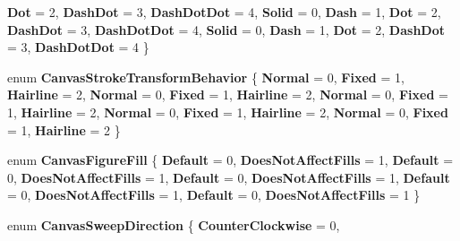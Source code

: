 \begin{DoxyCompactItemize}
\newline
{\bfseries Dot} = 2, 
{\bfseries Dash\+Dot} = 3, 
{\bfseries Dash\+Dot\+Dot} = 4, 
{\bfseries Solid} = 0, 
\newline
{\bfseries Dash} = 1, 
{\bfseries Dot} = 2, 
{\bfseries Dash\+Dot} = 3, 
{\bfseries Dash\+Dot\+Dot} = 4, 
\newline
{\bfseries Solid} = 0, 
{\bfseries Dash} = 1, 
{\bfseries Dot} = 2, 
{\bfseries Dash\+Dot} = 3, 
\newline
{\bfseries Dash\+Dot\+Dot} = 4
 \}
\item 
\mbox{\label{namespace_microsoft_1_1_graphics_1_1_canvas_1_1_geometry_a79c0c14002e1ebbc20c430497d584867}} 
enum {\bfseries Canvas\+Stroke\+Transform\+Behavior} \{ \newline
{\bfseries Normal} = 0, 
{\bfseries Fixed} = 1, 
{\bfseries Hairline} = 2, 
{\bfseries Normal} = 0, 
\newline
{\bfseries Fixed} = 1, 
{\bfseries Hairline} = 2, 
{\bfseries Normal} = 0, 
{\bfseries Fixed} = 1, 
\newline
{\bfseries Hairline} = 2, 
{\bfseries Normal} = 0, 
{\bfseries Fixed} = 1, 
{\bfseries Hairline} = 2, 
\newline
{\bfseries Normal} = 0, 
{\bfseries Fixed} = 1, 
{\bfseries Hairline} = 2
 \}
\item 
\mbox{\label{namespace_microsoft_1_1_graphics_1_1_canvas_1_1_geometry_aff867f5434d5804c2b0bcc7ada82e275}} 
enum {\bfseries Canvas\+Figure\+Fill} \{ \newline
{\bfseries Default} = 0, 
{\bfseries Does\+Not\+Affect\+Fills} = 1, 
{\bfseries Default} = 0, 
{\bfseries Does\+Not\+Affect\+Fills} = 1, 
\newline
{\bfseries Default} = 0, 
{\bfseries Does\+Not\+Affect\+Fills} = 1, 
{\bfseries Default} = 0, 
{\bfseries Does\+Not\+Affect\+Fills} = 1, 
\newline
{\bfseries Default} = 0, 
{\bfseries Does\+Not\+Affect\+Fills} = 1
 \}
\item 
\mbox{\label{namespace_microsoft_1_1_graphics_1_1_canvas_1_1_geometry_ac9b0f6a16960b87589d16512e46f64c1}} 
enum {\bfseries Canvas\+Sweep\+Direction} \{ \newline
{\bfseries Counter\+Clockwise} = 0, 

\end{DoxyCompactItemize}
